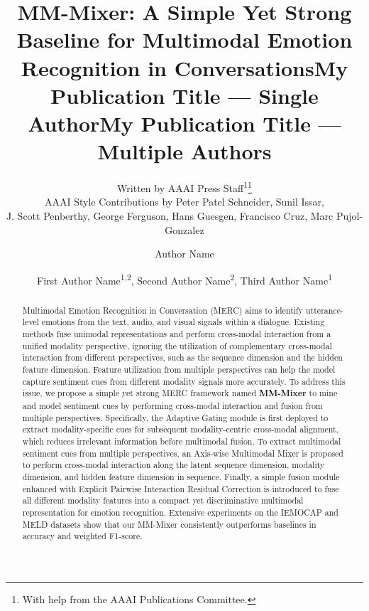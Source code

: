 \documentclass[letterpaper]{article} %
\title{MM-Mixer: A Simple Yet Strong Baseline for Multimodal Emotion Recognition in Conversations}
\author{
    Written by AAAI Press Staff\textsuperscript{\rm 1}\thanks{With help from the AAAI Publications Committee.}\\
    AAAI Style Contributions by Peter Patel Schneider,
    Sunil Issar,\\
    J. Scott Penberthy,
    George Ferguson,
    Hans Guesgen,
    Francisco Cruz\equalcontrib\corresponding,
    Marc Pujol-Gonzalez\equalcontrib\corresponding
}
\title{My Publication Title --- Single Author}
\author {
    Author Name
}
\title{My Publication Title --- Multiple Authors}
\author {
    First Author Name\textsuperscript{\rm 1,\rm 2}\equalcontrib,
    Second Author Name\textsuperscript{\rm 2}\equalcontrib,
    Third Author Name\textsuperscript{\rm 1}\corresponding
}
\begin{document}
\maketitle

\begin{abstract}
Multimodal Emotion Recognition in Conversation (MERC) aims to identify utterance-level emotions from the text, audio, and visual signals within a dialogue.
Existing methods fuse unimodal representations and perform cross-modal interaction from a unified modality perspective, ignoring the utilization of complementary cross-modal interaction from different perspectives, such as the sequence dimension and the hidden feature dimension. Feature utilization from multiple perspectives can help the model capture sentiment cues from different modality signals more accurately.
To address this issue, we propose a simple yet strong MERC framework named \textbf{MM-Mixer} to mine and model sentiment cues by performing cross-modal interaction and fusion from multiple perspectives. Specifically, the Adaptive Gating module is first deployed to extract modality-specific cues for subsequent modality-centric cross-modal alignment, which reduces irrelevant information before multimodal fusion. To extract multimodal sentiment cues from multiple perspectives, an Axis-wise Multimodal Mixer is proposed to perform cross-modal interaction along the latent sequence dimension, modality dimension, and hidden feature dimension in sequence. Finally, a simple fusion module enhanced with Explicit Pairwise Interaction Residual Correction is introduced to fuse all different modality features into a compact yet discriminative multimodal representation for emotion recognition. Extensive experiments on the IEMOCAP and MELD datasets show that our MM-Mixer consistently outperforms baselines in accuracy and weighted F1-score.


\end{abstract}
\end{document}
